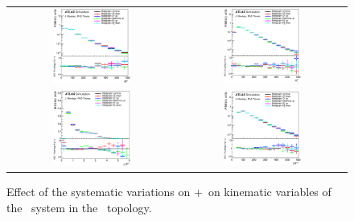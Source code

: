 \begin{figure}[p]
\begin{center}
\begin{tabular}{cc}
\includegraphics[width=0.48\textwidth]{Modeling/Figures/mgcc_tt2cq_qq_m_norm.eps} &
\includegraphics[width=0.48\textwidth]{Modeling/Figures/mgcc_tt2cq_qq_pt_norm.eps} \\
\includegraphics[width=0.48\textwidth]{Modeling/Figures/mgcc_tt2cq_qq_dr_norm.eps} &
\includegraphics[width=0.48\textwidth]{Modeling/Figures/mgcc_tt2cq_qq_ht_norm.eps} \\
\end{tabular}
\caption{Effect of the systematic variations on \madgraph+\pythia\ on kinematic variables of the \ccbar\ system in the \ttcc\ topology.}
\label{fig:mgcc_tt2c_cc}
\end{center}
\end{figure}
